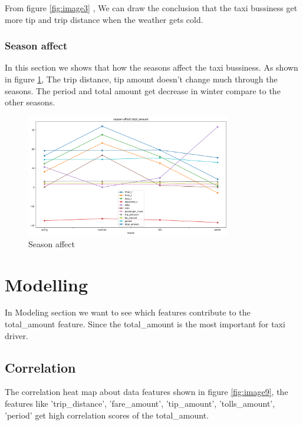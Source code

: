 \documentclass[11pt]{article}
\begin{document}
From ﬁgure \ref{fig:image3} , We can draw the conclusion that the taxi bussiness get more tip and trip distance when the weather gets cold.

\subsubsection{Season affect}
In this section we shows that how the seasons affect the taxi bussiness. 
As shown in figure \ref{fig:image4}, The trip distance, tip amount doesn't change much through the seasons. The period and total amount get decrease in winter compare to the other seasons. 

\begin{figure}[!h]
    \centering
    \includegraphics[width=0.8\textwidth]{plots/p9.png}
    \caption{Season affect} %
    \label{fig:image4}
\end{figure}


\section{Modelling}

In Modeling section we want to see which features contribute to the total\_amount feature. Since the total\_amount is the most important for taxi driver.

\subsection{Correlation}
The correlation heat map about data features shown in figure \ref{fig:image9}, the features like 'trip\_distance', 'fare\_amount', 'tip\_amount', 'tolls\_amount', 'period' get high correlation scores of the total\_amount.
\end{document}
